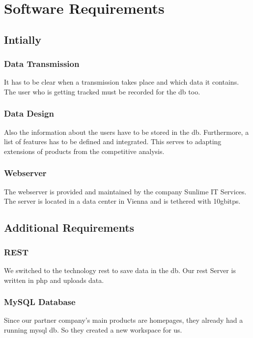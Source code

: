 \chapter{Software Requirements}
\section{Intially}
\subsection{Data Transmission}
It has to be clear when a transmission takes place and which data it contains. The user who is getting tracked must be recorded for the \gls{db} too.
\subsection{Data Design}
Also the information about the users have to be stored in the \gls{db}. Furthermore, a list of features has to be defined and integrated. This serves to adapting extensions of products from the competitive analysis.
\subsection{Webserver}
The webserver is provided and maintained by the company Sunlime IT Services. The server is located in a data center in Vienna and is tethered with 10\gls{gbitps}.
\section{Additional Requirements}
\subsection{REST}
We switched to the technology \gls{rest} to save data in the \gls{db}. Our \gls{rest} Server is written in \gls{php} and uploads data.
\subsection{MySQL Database}
Since our partner company’s main products are homepages, they already had a running \gls{mysql} \gls{db}. So they created a new workspace for us.


